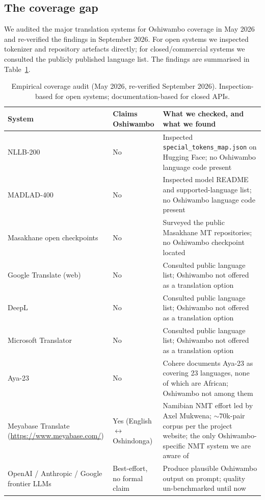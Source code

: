 \documentclass[11pt]{article}
\begin{document}
\subsection{The coverage gap}
\label{sec:coverage-gap}

We audited the major translation systems for Oshiwambo coverage in
May 2026 and re-verified the findings in September 2026. For open systems we inspected tokenizer and repository
artefacts directly; for closed/commercial systems we consulted the
publicly published language list. The findings are summarised in
Table~\ref{tab:coverage}.

\begin{table}[t]
\centering
\small
\begin{tabular}{p{4cm}p{3cm}p{8cm}}
\toprule
\textbf{System} & \textbf{Claims Oshiwambo} & \textbf{What we checked, and what we found} \\
\midrule
NLLB-200 \citep{costajussa2022nllb} & No & Inspected \texttt{special\_tokens\_map.json} on Hugging Face; no Oshiwambo language code present \\
MADLAD-400 \citep{kudugunta2023madlad} & No & Inspected model README and supported-language list; no Oshiwambo language code present \\
Masakhane open checkpoints & No & Surveyed the public Masakhane MT repositories; no Oshiwambo checkpoint located \\
Google Translate (web) & No & Consulted public language list; Oshiwambo not offered as a translation option \\
DeepL & No & Consulted public language list; Oshiwambo not offered as a translation option \\
Microsoft Translator & No & Consulted public language list; Oshiwambo not offered as a translation option \\
Aya-23 \citep{aryabumi2024aya} & No & Cohere documents Aya-23 as covering 23 languages, none of which are African; Oshiwambo not among them \\
Meyabase Translate (\url{https://www.meyabase.com/}) & Yes (English $\leftrightarrow$ Oshindonga) & Namibian NMT effort led by Axel Mukwena; $\sim 70$k-pair corpus per the project website; the only Oshiwambo-specific NMT system we are aware of \\
OpenAI / Anthropic / Google frontier LLMs & Best-effort, no formal claim & Produce plausible Oshiwambo output on prompt; quality un-benchmarked until now \\
\bottomrule
\end{tabular}
\caption{Empirical coverage audit (May 2026, re-verified September 2026). Inspection-based for open systems; documentation-based for closed APIs.}
\label{tab:coverage}
\end{table}
\end{document}
